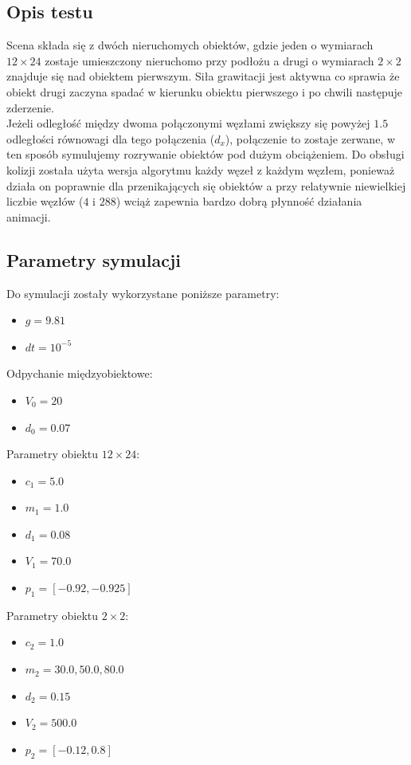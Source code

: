 \documentclass[12pt, letterpaper]{report}
\begin{document}
    \subsection{Opis testu}
    Scena składa się z dwóch nieruchomych obiektów, gdzie jeden o wymiarach $12 \times 24$ zostaje umieszczony nieruchomo 
    przy podłożu a drugi o wymiarach $2 \times 2$ znajduje się nad obiektem pierwszym. Siła grawitacji jest aktywna co 
    sprawia że obiekt drugi zaczyna spadać w kierunku obiektu pierwszego i po chwili następuje zderzenie. \\ 

    Jeżeli odległość między dwoma połączonymi węzłami zwiększy się powyżej $1.5$ odległości równowagi dla 
    tego połączenia ($d_x$), połączenie to zostaje zerwane, w ten sposób symulujemy rozrywanie obiektów pod dużym 
    obciążeniem. Do obsługi kolizji została użyta wersja algorytmu każdy węzeł z każdym węzłem, ponieważ
    działa on poprawnie dla przenikających się obiektów a przy relatywnie niewielkiej liczbie 
    węzłów ($4$ i $288$) wciąż zapewnia bardzo dobrą płynność działania animacji.

    \subsection{Parametry symulacji}
    Do symulacji zostały wykorzystane poniższe parametry:
    \begin{multicols*}{2}
        \begin{itemize}
            \item $g = 9.81$
            \item $dt = 10^{-5}$
        \end{itemize}
        Odpychanie międzyobiektowe:
        \begin{itemize}
            \item $V_{0} = 20$
            \item $d_{0} = 0.07$
        \end{itemize}
        Parametry obiektu $12 \times 24$:
        \begin{itemize}
            \item $c_{1} = 5.0$
            \item $m_{1} = 1.0$
            \item $d_{1} = 0.08$
            \item $V_{1} = 70.0$
            \item $p_{1} = [-0.92, -0.925]$
        \end{itemize}
        Parametry obiektu $2 \times 2$:
        \begin{itemize}
            \item $c_{2} = 1.0$
            \item $m_{2} = 30.0, 50.0, 80.0$
            \item $d_{2} = 0.15$
            \item $V_{2} = 500.0$
            \item $p_{2} = [-0.12, 0.8]$
        \end{itemize}
    \end{multicols*}
\end{document}
